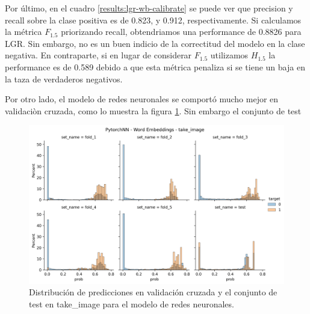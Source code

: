 Por último, en el cuadro \ref{results:lgr-wb-calibrate} se puede ver que
precision y recall sobre la clase positiva es de 0.823, y 0.912,
respectivamente. Si calculamos la métrica $F_{1.5}$ priorizando recall,
obtendriamos una performance de 0.8826 para LGR. Sin embargo, no es un buen
indicio de la correctitud del modelo en la clase negativa. En contraparte, si en
lugar de considerar $F_{1.5}$ utilizamos $H_{1.5}$ la performance es de 0.589
debido a que esta métrica penaliza si se tiene un baja en la taza de verdaderos
negativos.


\begin{table}[h!]
\centering
{}
 \caption{Métricas sobre el conjunto de test del modelo de LGR con word embeddings.}
 \label{results:lgr-wb-calibrate}
\end{table}

Por otro lado, el modelo de redes neuronales se comportó mucho mejor en
validaciòn cruzada, como lo muestra la figura
\ref{fig:nn-distplot-takeimage-wb}. Sin embargo el conjunto de test

\begin{figure}[b!]
    \centering
    \includegraphics[width=\linewidth]{figures/results/word_embeddings/nn/take_image/take_image__distplot.png}
    \caption{Distribución de predicciones en validación cruzada y el conjunto de test en take\_image para el modelo de redes neuronales.}
    \label{fig:nn-distplot-takeimage-wb}
\end{figure}

